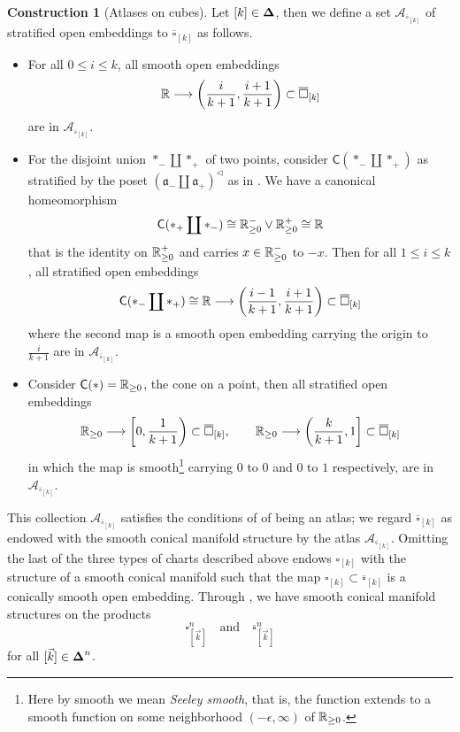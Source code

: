 \documentclass[10pt, reqno, twoside
, final
]{amsart}
\numberwithin{equation}{subsection}%
\theoremstyle{definition}
\theoremstyle{definition}
\theoremstyle{definition}
\theoremstyle{definition}
\newtheorem{cons}[defn]{Construction}
\theoremstyle{definition}
\theoremstyle{definition}
\theoremstyle{definition}
\theoremstyle{definition}
\theoremstyle{definition}
\theoremstyle{plain}
\theoremstyle{definition}
\theoremstyle{plain}
\theoremstyle{definition}
\theoremstyle{plain}
\theoremstyle{definition}
\theoremstyle{definition}
\theoremstyle{plain}
\theoremstyle{plain}
\theoremstyle{definition}
\theoremstyle{plain}
\theoremstyle{plain}
\theoremstyle{plain}
\begin{document}
\begin{cons}[Atlases on cubes]\label{cons:cubeatalas}
Let $[k]\in\boldsymbol{\Delta}$, then we define a set $\mathcal{A}_{\overline{\square}_{[k]}}$ of stratified open embeddings to $\overline{\square}_{[k]}$ as follows.
\begin{itemize}
    \item For all $0\leq i\leq k$, all smooth open embeddings 
    \[ \mathbb{R}\longrightarrow \left(\frac{i}{k+1},\frac{i+1}{k+1}\right) \subset \overline{\square}_{[k]}   \]
    are in $\mathcal{A}_{\overline{\square}_{[k]}}$.
    \item For the disjoint union $*_-\coprod *_+$ of two points, consider $\mathsf{C}(*_-\coprod *_+)$ as stratified by the poset $(\mathfrak{a}_-\coprod\mathfrak{a}_+)^{\lhd}$ as in  . We have a canonical homeomorphism 
    \[ \mathsf{C}(*_+\coprod *_-)\cong \mathbb{R}^-_{\geq 0} \vee \mathbb{R}^+_{\geq 0}  \cong \mathbb{R} \]
    that is the identity on $\mathbb{R}_{\geq 0}^+$ and carries $x\in \mathbb{R}_{\geq 0}^-$ to $-x$. Then for all $1\leq i\leq k$, all stratified open embeddings 
    \[  \mathsf{C}(*_-\coprod *_+)\cong \mathbb{R}\longrightarrow  \left(\frac{i-1}{k+1},\frac{i+1}{k+1}\right) \subset \overline{\square}_{[k]}   \]
    where the second map is a smooth open embedding carrying the origin to $\frac{i}{k+1}$ are in $\mathcal{A}_{\overline{\square}_{[k]}}$.
    \item Consider $\mathsf{C}(*)=\mathbb{R}_{\geq 0}$, the cone on a point, then all stratified open embeddings 
    \[  \mathbb{R}_{\geq 0} \longrightarrow \left[0,\frac{1}{k+1}\right)\subset \overline{\square}_{[k]},\quad\quad \mathbb{R}_{\geq 0} \longrightarrow \left(\frac{k}{k+1},1\right]\subset \overline{\square}_{[k]}   \]
    in which the map is smooth\footnote{Here by smooth we mean \emph{Seeley smooth}, that is, the function extends to a smooth function on some neighborhood $(-\epsilon,\infty)$ of $\mathbb{R}_{\geq 0}$.} carrying $0$ to $0$ and $0$ to $1$ respectively, are in $\mathcal{A}_{\overline{\square}_{[k]}}$.
\end{itemize}
This collection $\mathcal{A}_{\overline{\square}_{[k]}}$ satisfies the conditions of \cite[Definition 3.2.10]{AFT-local-structures} of being an atlas; we regard $\overline{\square}_{[k]}$ as endowed with the smooth conical manifold structure by the atlas $\mathcal{A}_{\overline{\square}_{[k]}}$. Omitting the last of the three types of charts described above endows $\square_{[k]}$ with the structure of a smooth conical manifold such that the map $\square_{[k]}\subset \overline{\square}_{[k]}$ is a conically smooth open embedding. Through \cite[Lemma 3.4.8, Corollary 3.4.9, Corollary 3.4.10]{AFT-local-structures}, we have smooth conical manifold structures on the products 
\[  \square_{[\vec{k}]}^n\quad\text{and}\quad \overline{\square}_{[\vec{k}]}^n\]
for all $[\vec{k}]\in \boldsymbol{\Delta}^n$.
\end{cons}
\end{document}
